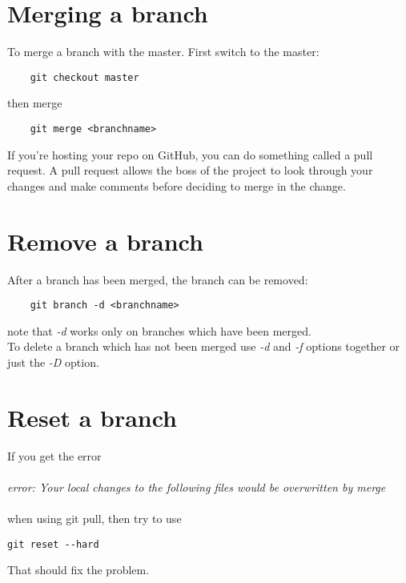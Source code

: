 \documentclass[10pt,letterpaper]{book}
\begin{document}
\section{Merging a branch}
To merge a branch with the master. First switch to the master:
\begin{lstlisting}
	git checkout master
\end{lstlisting}
then merge
\begin{lstlisting}
	git merge <branchname>
\end{lstlisting}
If you're hosting your repo on GitHub, you can do something called a pull request. A pull request allows the boss of the project to look through your changes and make comments before deciding to merge in the change.

\section{Remove a branch}
After a branch has been merged, the branch can be removed:
\begin{lstlisting}
	git branch -d <branchname>
\end{lstlisting}
note that \textit{-d} works only on branches which have been merged.\\
To delete a branch which has not been merged use \textit{-d} and \textit{-f} options together or just the \textit{-D} option.

\section{Reset a branch}
If you get the error\\ \\
\textit{error: Your local changes to the following files would be overwritten by merge}\\ \\
when using git pull, then try to use
\begin{lstlisting}
git reset --hard
\end{lstlisting}

That should fix the problem.
\end{document}
